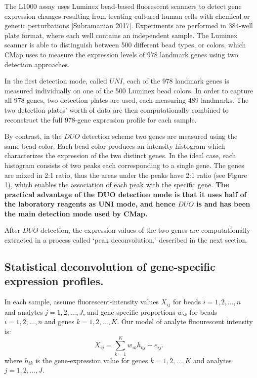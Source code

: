 \documentclass[]{article}
\begin{document}
The L1000 assay uses Luminex bead-based fluorescent scanners to detect
gene expression changes resulting from treating cultured human cells
with chemical or genetic perturbations {[}Subramanian 2017{]}.
Experiments are performed in 384-well plate format, where each well
contains an independent sample. The Luminex scanner is able to
distinguish between 500 different bead types, or colors, which CMap uses
to measure the expression levels of 978 landmark genes using two
detection approaches.

In the first detection mode, called \(UNI\), each of the 978 landmark
genes is measured individually on one of the 500 Luminex bead colors. In
order to capture all 978 genes, two detection plates are used, each
measuring 489 landmarks. The two detection plates' worth of data are
then computationally combined to reconstruct the full 978-gene
expression profile for each sample.

By contrast, in the \(DUO\) detection scheme two genes are measured
using the same bead color. Each bead color produces an intensity
histogram which characterizes the expression of the two distinct genes.
In the ideal case, each histogram consists of two peaks each
corresponding to a single gene. The genes are mixed in 2:1 ratio, thus
the areas under the peaks have 2:1 ratio (see Figure 1), which enables
the association of each peak with the specific gene. \textbf{The
practical advantage of the DUO detection mode is that it uses half of
the laboratory reagents as UNI mode, and hence \(DUO\) is and has been
the main detection mode used by CMap.}

After \(DUO\) detection, the expression values of the two genes are
computationally extracted in a process called `peak deconvolution,'
described in the next section.

\hypertarget{statistical-deconvolution-of-gene-specific-expression-profiles.}{%
\subsection{Statistical deconvolution of gene-specific expression
profiles.}\label{statistical-deconvolution-of-gene-specific-expression-profiles.}}

In each sample, assume fluorescent-intensity values \(X_{ij}\) for beads
\(i=1,2,\dots, n\) and analytes \(j=1,2,\dots, J\), and gene-specific
proportions \(w_{ik}\) for beads \(i=1,2,\dots, n\) and genes
\(k=1,2,\dots, K\). Our model of analyte fluourescent intensity is: \[
  X_{ij} = \sum_{k=1}^{K} w_{ik} h_{kj} + e_{ij}. 
\] where \(h_{ik}\) is the gene-expression value for genes
\(k=1,2,\dots, K\) and analytes \(j=1,2,\dots, J\).
\end{document}

